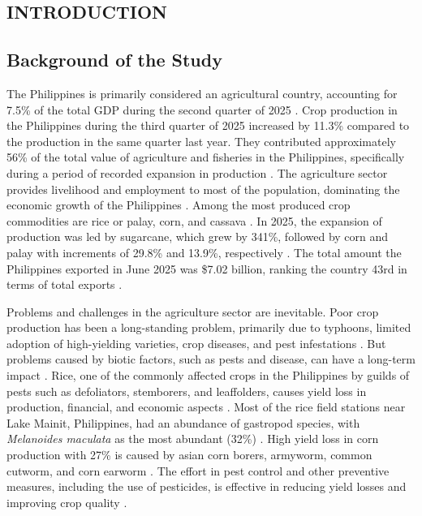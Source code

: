 \documentclass{icsthesis}
\begin{document}
	\begin{mainmatter}
		\section{INTRODUCTION}
			\subsection{Background of the Study}
            The Philippines is primarily considered an agricultural country, accounting for 7.5\% of the total GDP during the second quarter of 2025 \cite{authentication2-no-date}. Crop production in the Philippines during the third quarter of 2025 increased by 11.3\% compared to the production in the same quarter last year. They contributed approximately 56\% of the total value of agriculture and fisheries in the Philippines, specifically during a period of recorded expansion in production \cite{psa-2025}. The agriculture sector provides livelihood and employment to most of the population, dominating the economic growth of the Philippines \cite{dogello-2021}. Among the most produced crop commodities are rice or palay, corn, and cassava \cite{Balendres_2023}. In 2025, the expansion of production was led by sugarcane, which grew by 341\%, followed by corn and palay with increments of 29.8\% and 13.9\%, respectively \cite{authentication2-no-date}. The total amount the Philippines exported in June 2025 was \$7.02 billion, ranking the country 43rd in terms of total exports \cite{philippines-exports}.

            Problems and challenges in the agriculture sector are inevitable. Poor crop production has been a long-standing problem, primarily due to typhoons, limited adoption of high-yielding varieties, crop diseases, and pest infestations \cite{Brown_2020}. But problems caused by biotic factors, such as pests and disease, can have a long-term impact \cite{Balendres_2023}. Rice, one of the commonly affected crops in the Philippines by guilds of pests such as defoliators, stemborers, and leaffolders, causes yield loss in production, financial, and economic aspects \cite{Litsinger_Bandong_Canapi_2011}. Most of the rice field stations near Lake Mainit, Philippines, had an abundance of gastropod species, with \textit{Melanoides maculata} as the most abundant (32\%) \cite{jumawan-2025}. High yield loss in corn production with 27\% is caused by asian corn borers, armyworm, common cutworm, and corn earworm \cite{Afidchao_Musters_De}. The effort in pest control and other preventive measures, including the use of pesticides, is effective in reducing yield losses and improving crop quality \cite{damalas-2011}.


\end{mainmatter}
\end{document}
